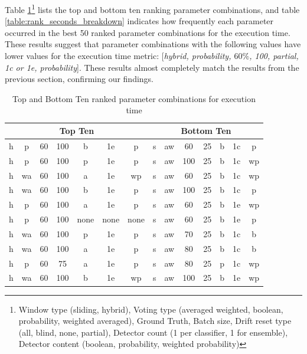 
Table \ref{table:rank_seconds_top_bottom_10}\footnote{Window type (sliding, hybrid), Voting type (averaged weighted, boolean, probability, weighted averaged), Ground Truth, Batch size, Drift reset type (all, blind, none, partial), Detector count (1 per classifier, 1 for ensemble), Detector content (boolean, probability, weighted probability)} lists the top and bottom ten ranking parameter combinations, and table \ref{table:rank_seconds_breakdown} indicates how frequently each parameter occurred in the best 50 ranked parameter combinations for the execution time. These results suggest that parameter combinations with the following values have lower values for the execution time metric: [\textit{hybrid, probability, $60\%$, 100, partial, 1c or 1e, probability}]. These results almost completely match the results from the previous section, confirming our findings.

\begin{table}[]
\centering
\caption{\label{table:rank_seconds_top_bottom_10}Top and Bottom Ten ranked parameter combinations for execution time}
\begin{tabular}{|c|c|c|c|c|c|c||c|c|c|c|c|c|c|}
\hline
\multicolumn{7}{|c||}{\textbf{Top Ten}} & \multicolumn{7}{c|}{\textbf{Bottom Ten}} \\ \hline \hhline{=======#=======}
h & p & 60 & 100 & b & 1e & p & s & aw & 60 & 25 & b & 1c & p \\ \hline
h & p & 60 & 100 & p & 1e & p & s & aw & 100 & 25 & b & 1c & wp \\ \hline
h & wa & 60 & 100 & a & 1e & wp & s & aw & 60 & 25 & b & 1c & wp \\ \hline
h & wa & 60 & 100 & b & 1e & p & s & aw & 100 & 25 & b & 1c & p \\ \hline
h & p & 60 & 100 & a & 1e & p & s & aw & 60 & 25 & b & 1e & wp \\ \hline
h & p & 60 & 100 & none & none & none & s & aw & 60 & 25 & b & 1e & p \\ \hline
h & wa & 60 & 100 & p & 1e & p & s & aw & 70 & 25 & b & 1c & b \\ \hline
h & wa & 60 & 100 & a & 1e & p & s & aw & 80 & 25 & b & 1c & b \\ \hline
h & p & 60 & 75 & a & 1e & p & s & aw & 80 & 25 & p & 1c & wp \\ \hline
h & wa & 60 & 100 & b & 1e & wp & s & aw & 100 & 25 & b & 1e & wp \\ \hline
\end{tabular}
\end{table}

